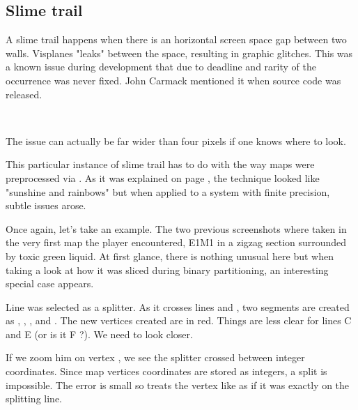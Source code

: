 \subsection{Slime trail}
A slime trail happens when there is an horizontal screen space gap between two walls. Visplanes "leaks" between the space, resulting in graphic glitches. This was a known issue during development that due to deadline and rarity of the occurrence was never fixed. John Carmack mentioned it when  source code was released.\\
\par
{}\\
\par



The issue can actually be far wider than four pixels if one knows where to look.\\
\par
{}
\par
This particular instance of slime trail has to do with the way maps were preprocessed via . As it was explained on page \pageref{Binary Space Partitioning: Theory}, the technique looked like "sunshine and rainbows" but when applied to a system with finite precision, subtle issues arose.\\
\par
 Once again, let's take an example. The two previous screenshots where taken in the very first map the player encountered, E1M1 in a zigzag section surrounded by toxic green liquid. At first glance, there is nothing unusual here but when taking a look at how it was sliced during binary partitioning, an interesting special case appears.\\
\par
Line  was selected as a splitter. As it crosses lines  and , two segments are created as , , , and . The new vertices created are in red. Things are less clear for lines C and E (or is it F ?). We need to look closer. \\
\par
If we zoom him on vertex , we see the splitter crossed  between integer coordinates. Since map vertices coordinates are stored as integers, a split is impossible. The error is small so  treats the vertex like as if it was exactly on the splitting line.

